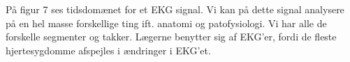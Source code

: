 \documentclass[12pt, letterpaper]{article}
\begin{document}
\begin{figure}[!h]
           \begin{floatrow}
       
           \end{floatrow}
\end{figure} 

På figur 7 ses tidsdomænet for et EKG signal. Vi kan på dette signal analysere på en hel masse forskellige ting ift. anatomi og patofysiologi. Vi har alle de forskelle segmenter og takker. Lægerne benytter sig af EKG'er, fordi de fleste hjertesygdomme afspejles i ændringer i EKG'et.


\newpage
\end{document}
